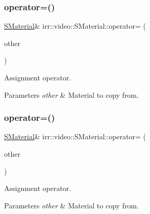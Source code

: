 \subsubsection{\texorpdfstring{operator=()}{operator=()}\hspace{0.1cm}{\footnotesize\ttfamily [1/2]}}
{\footnotesize\ttfamily \hyperlink{classirr_1_1video_1_1SMaterial}{S\+Material}\& irr\+::video\+::\+S\+Material\+::operator= (\begin{DoxyParamCaption}\item[{const \hyperlink{classirr_1_1video_1_1SMaterial}{S\+Material} \&}]{other }\end{DoxyParamCaption})\hspace{0.3cm}{\ttfamily [inline]}}



Assignment operator. 


\begin{DoxyParams}{Parameters}
{\em other} & Material to copy from. \\
\hline
\end{DoxyParams}
\mbox{\label{classirr_1_1video_1_1SMaterial_a752ea337daa705d8d7035f0ee93d178d}} 
\subsubsection{\texorpdfstring{operator=()}{operator=()}\hspace{0.1cm}{\footnotesize\ttfamily [2/2]}}
{\footnotesize\ttfamily \hyperlink{classirr_1_1video_1_1SMaterial}{S\+Material}\& irr\+::video\+::\+S\+Material\+::operator= (\begin{DoxyParamCaption}\item[{const \hyperlink{classirr_1_1video_1_1SMaterial}{S\+Material} \&}]{other }\end{DoxyParamCaption})\hspace{0.3cm}{\ttfamily [inline]}}



Assignment operator. 


\begin{DoxyParams}{Parameters}
{\em other} & Material to copy from. \\
\hline
\end{DoxyParams}
\mbox{\label{classirr_1_1video_1_1SMaterial_a32066f6f8ee564be1cabc73de1d0cb6a}} 
